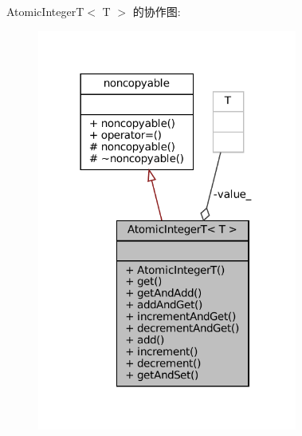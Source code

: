 Atomic\+IntegerT$<$ T $>$ 的协作图\+:
\nopagebreak
\begin{figure}[H]
\begin{center}
\leavevmode
\includegraphics[width=242pt]{classmuduo_1_1detail_1_1AtomicIntegerT__coll__graph}
\end{center}
\end{figure}
